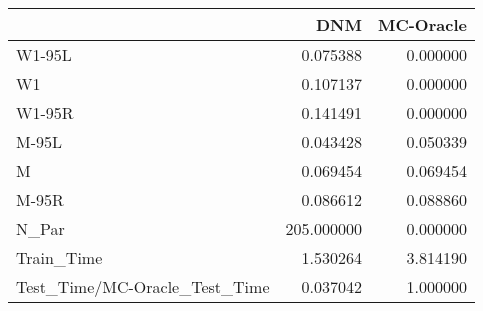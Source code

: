 \begin{tabular}{lrr}
\toprule
{} &         DNM &  MC-Oracle \\
\midrule
W1-95L                        &    0.075388 &   0.000000 \\
W1                            &    0.107137 &   0.000000 \\
W1-95R                        &    0.141491 &   0.000000 \\
M-95L                         &    0.043428 &   0.050339 \\
M                             &    0.069454 &   0.069454 \\
M-95R                         &    0.086612 &   0.088860 \\
N\_Par                         &  205.000000 &   0.000000 \\
Train\_Time                    &    1.530264 &   3.814190 \\
Test\_Time/MC-Oracle\_Test\_Time &    0.037042 &   1.000000 \\
\bottomrule
\end{tabular}
